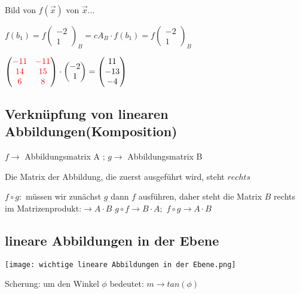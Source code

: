 \begin{multicols*}{3}
    { Bild von $f(\vec{x})$ von $\vec{x} ... $}

    {$ f(b_1) = f(\begin{matrix}
                -2 \\
                1
            \end{matrix})_B = cA_B \cdot f(b_1) = f(\begin{matrix}
                -2 \\
                1
            \end{matrix})_B$}

    {$\begin{pmatrix}
                {\color{red}-11} & {\color{red}-11} \\
                {\color{red}14}  & {\color{red}15}  \\
                {\color{red}6}   & {\color{red}8}
            \end{pmatrix} \cdot \begin{pmatrix}
                -2 \\
                1
            \end{pmatrix} = \begin{pmatrix}
                11  \\
                -13 \\
                -4
            \end{pmatrix}$}

    \vfill\null
    \columnbreak
    \subsection{  Verknüpfung von linearen Abbildungen(Komposition)
    }
    {$f \to $ Abbildungsmatrix A ; $g \to $ Abbildungsmatrix B}

    {Die Matrix der Abbildung, die zuerst ausgeführt wird, steht $rechts$}

    {$f \circ g:$ müssen wir zunächst $g$ dann $f$
        ausführen, daher steht die Matrix $B$ rechts im Matrizenprodukt:}$\to A \cdot B$
    {{$g \circ f \to B \cdot A; $  }{$f \circ g \to A \cdot B$  }}

    \subsection{ lineare Abbildungen in der Ebene}

    {\texttt{[image: wichtige lineare Abbildungen in der Ebene.png]}}

    {Scherung: um den Winkel $\phi$ bedeutet: $m \to tan(\phi)$  }


\end{multicols*}
